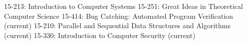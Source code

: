 
\begin{projects}

    \course
    {15-213:} {Introduction to Computer Systems}
    \course
    {15-251:} {Great Ideas in Theoretical Computer Science}   
    \course
    {15-414:} {Bug Catching: Automated Program Verification (current)}   
    \course
    {15-210:} {Parallel and Sequential Data Structures and Algorithms (current)}  
    \course
    {15-330:} {Introduction to Computer Security (current)}
	
\end{projects}